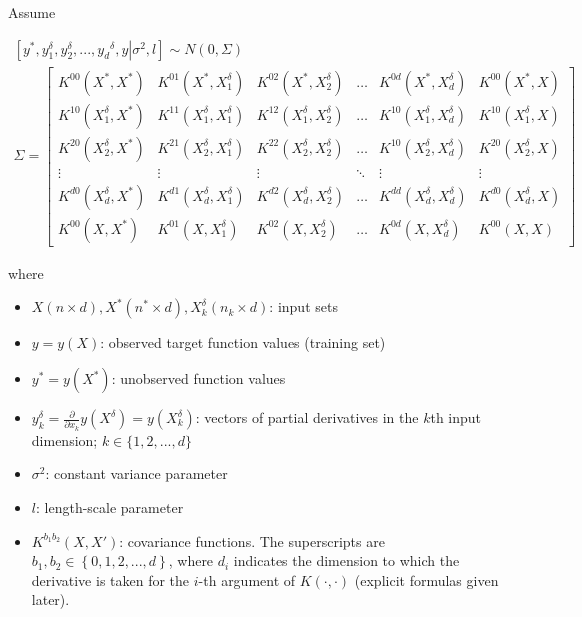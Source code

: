 \documentclass{sfuthesis}
\begin{document}
Assume

  \begin{gather}
\left[ {{y^*},y_1^\delta ,y_2^\delta ,...,{y_d}^\delta ,y\left| {{\sigma ^2},l} \right.} \right]\sim N\left( {0,\Sigma } \right) \\
\Sigma  = \left[ {\begin{array}{*{20}{c}}
{{K^{00}}\left( {{X^*},{X^*}} \right)}&{{K^{01}}\left( {{X^*},X_1^\delta } \right)}&{{K^{02}}\left( {{X^*},X_2^\delta } \right)}& \ldots &{{K^{0d}}\left( {{X^*},X_d^\delta } \right)}&{{K^{00}}\left( {{X^*},X} \right)}\\
{{K^{10}}\left( {X_1^\delta ,{X^*}} \right)}&{{K^{11}}\left( {X_1^\delta ,X_1^\delta } \right)}&{{K^{12}}\left( {X_1^\delta ,X_2^\delta } \right)}& \ldots &{{K^{10}}\left( {X_1^\delta ,X_d^\delta } \right)}&{{K^{10}}\left( {X_1^\delta ,X} \right)}\\
{{K^{20}}\left( {X_2^\delta ,{X^*}} \right)}&{{K^{21}}\left( {X_2^\delta ,X_1^\delta } \right)}&{{K^{22}}\left( {X_2^\delta ,X_2^\delta } \right)}& \ldots &{{K^{10}}\left( {X_2^\delta ,X_d^\delta } \right)}&{{K^{20}}\left( {X_2^\delta ,X} \right)}\\
 \vdots & \vdots & \vdots & \ddots & \vdots & \vdots \\
{{K^{d0}}\left( {X_d^\delta ,{X^*}} \right)}&{{K^{d1}}\left( {X_d^\delta ,X_1^\delta } \right)}&{{K^{d2}}\left( {X_d^\delta ,X_2^\delta } \right)}& \ldots &{{K^{dd}}\left( {X_d^\delta ,X_d^\delta } \right)}&{{K^{d0}}\left( {X_d^\delta ,X} \right)}\\
{{K^{00}}\left( {X,{X^*}} \right)}&{{K^{01}}\left( {X,X_1^\delta } \right)}&{{K^{02}}\left( {X,X_2^\delta } \right)}& \ldots &{{K^{0d}}\left( {X,X_d^\delta } \right)}&{{K^{00}}\left( {X,X} \right)}
\end{array}} \right]
  \end{gather}

    where 
    
    \begin{itemize}
        \item $X (n \times d), X^* (n^* \times d), X_k^\delta (n_k \times d)$: input sets
        \item $y = y(X)$: observed target function values (training set) 
        \item $y^* = y(X^*)$: unobserved function values
        \item $y_k^\delta = \frac{\partial }{{\partial {x_k}}}y\left( {{X^\delta }} \right) = y(X_k^\delta)$: vectors of partial derivatives in the $k$th input dimension; $k \in \{ 1, 2, ..., d \}$
        \item $\sigma^2$: constant variance parameter
        \item $l$: length-scale parameter
        \item $K^{b_1 b_2}(X, X')$: covariance functions. The superscripts are $b_1, b_2 \in \left\{ {0,1,2,...,d} \right\}$, where $d_i$ indicates the dimension to which the derivative is taken for the $i$-th argument of $K(\cdot, \cdot)$ (explicit formulas given later).
    \end{itemize}
\end{document}
